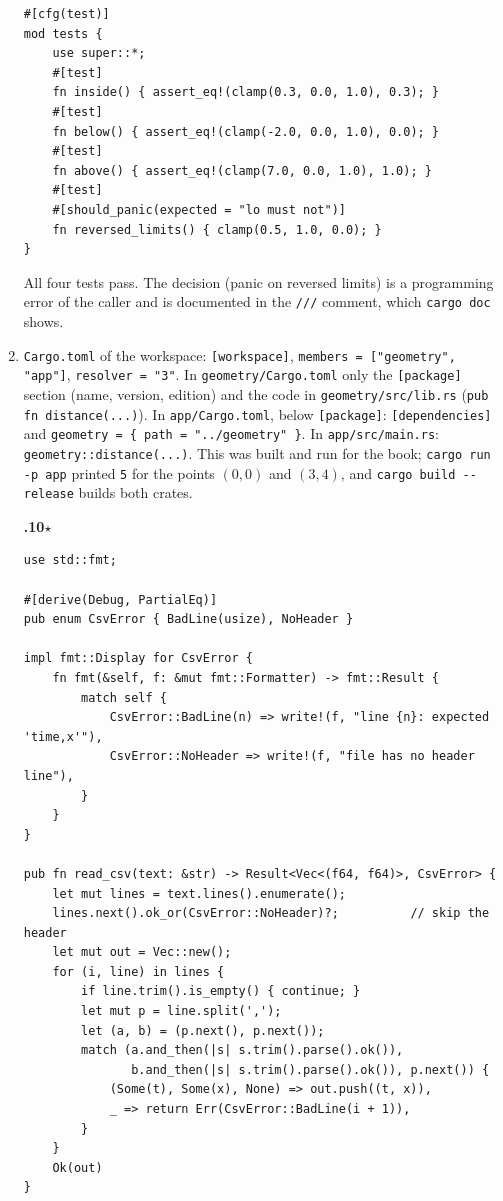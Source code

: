 \begin{enumerate}[label=\textbf{\ansnum.\arabic*}]
\begin{verbatim}
#[cfg(test)]
mod tests {
    use super::*;
    #[test]
    fn inside() { assert_eq!(clamp(0.3, 0.0, 1.0), 0.3); }
    #[test]
    fn below() { assert_eq!(clamp(-2.0, 0.0, 1.0), 0.0); }
    #[test]
    fn above() { assert_eq!(clamp(7.0, 0.0, 1.0), 1.0); }
    #[test]
    #[should_panic(expected = "lo must not")]
    fn reversed_limits() { clamp(0.5, 1.0, 0.0); }
}
\end{verbatim}
All four tests pass. The decision (panic on reversed limits) is a programming error of the caller and is documented in the \verb!///! comment, which \verb!cargo doc! shows.
  \item \verb!Cargo.toml! of the workspace: \verb![workspace]!, \verb!members = ["geometry", "app"]!, \verb!resolver = "3"!. In \verb!geometry/Cargo.toml! only the \verb![package]! section (name, version, edition) and the code in \verb!geometry/src/lib.rs! (\verb!pub fn distance(...)!). In \verb!app/Cargo.toml!, below \verb![package]!: \verb![dependencies]! and \verb!geometry = { path = "../geometry" }!. In \verb!app/src/main.rs!: \verb!geometry::distance(...)!. This was built and run for the book; \verb!cargo run -p app! printed \verb!5! for the points $(0,0)$ and $(3,4)$, and \verb!cargo build --release! builds both crates.
  \item[\textbf{\ansnum.10}$\star$]
\begin{verbatim}
use std::fmt;

#[derive(Debug, PartialEq)]
pub enum CsvError { BadLine(usize), NoHeader }

impl fmt::Display for CsvError {
    fn fmt(&self, f: &mut fmt::Formatter) -> fmt::Result {
        match self {
            CsvError::BadLine(n) => write!(f, "line {n}: expected 'time,x'"),
            CsvError::NoHeader => write!(f, "file has no header line"),
        }
    }
}

pub fn read_csv(text: &str) -> Result<Vec<(f64, f64)>, CsvError> {
    let mut lines = text.lines().enumerate();
    lines.next().ok_or(CsvError::NoHeader)?;          // skip the header
    let mut out = Vec::new();
    for (i, line) in lines {
        if line.trim().is_empty() { continue; }
        let mut p = line.split(',');
        let (a, b) = (p.next(), p.next());
        match (a.and_then(|s| s.trim().parse().ok()),
               b.and_then(|s| s.trim().parse().ok()), p.next()) {
            (Some(t), Some(x), None) => out.push((t, x)),
            _ => return Err(CsvError::BadLine(i + 1)),
        }
    }
    Ok(out)
}


\end{verbatim}
\end{enumerate}
